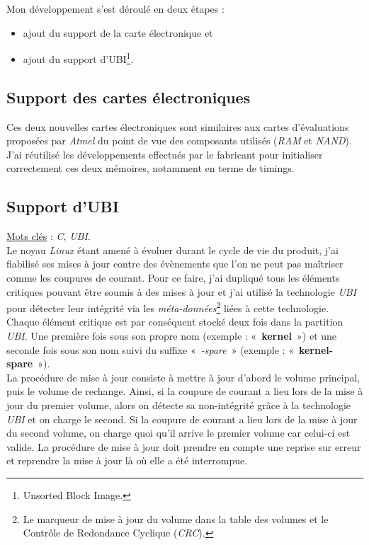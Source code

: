 \documentclass[a4paper]{article}
\begin{document}
Mon développement s'est déroulé en deux étapes :
\begin{itemize}
\item ajout du support de la carte électronique et
\item ajout du support d'UBI\footnote{Unsorted Block Image.}.
\end{itemize}

\subsection{Support des cartes électroniques}

Ces deux nouvelles cartes électroniques sont similaires aux cartes d'évaluations proposées par \textit{Atmel} du point de vue des composants utilisés (\textit{RAM} et \textit{NAND}). J'ai réutilisé les développements effectués par le fabricant pour initialiser correctement ces deux mémoires, notamment en terme de timings.

\subsection{Support d'UBI}

\underline{Mots clés} : \textit{C}, \textit{UBI}.\\

Le noyau \textit{Linux} étant amené à évoluer durant le cycle de vie du produit, j'ai fiabilisé ses mises à jour contre des évènements que l'on ne peut pas maîtriser comme les coupures de courant. Pour ce faire, j'ai dupliqué tous les éléments critiques pouvant être soumis à des mises à jour et j'ai utilisé la technologie \textit{UBI} pour détecter leur intégrité via les \textit{méta-données}\footnote{Le marqueur de mise à jour du volume dans la table des volumes et le Contrôle de Redondance Cyclique (\textit{CRC}).} liées à cette technologie.\\

Chaque élément critique est par conséquent stocké deux fois dans la partition \textit{UBI}. Une première fois sous son propre nom (exemple : «~\textbf{kernel}~») et une seconde fois sous son nom suivi du suffixe «~\textit{-spare}~» (exemple : «~\textbf{kernel-spare}~»).\\

La procédure de mise à jour consiste à mettre à jour d'abord le volume principal, puis le volume de rechange. Ainsi, si la coupure de courant a lieu lors de la mise à jour du premier volume, alors on détecte sa non-intégrité grâce à la technologie \textit{UBI} et on charge le second. Si la coupure de courant a lieu lors de la mise à jour du second volume, on charge quoi qu'il arrive le premier volume car celui-ci est valide. La procédure de mise à jour doit prendre en compte une reprise sur erreur et reprendre la mise à jour là où elle a été interrompue.\\
\end{document}
